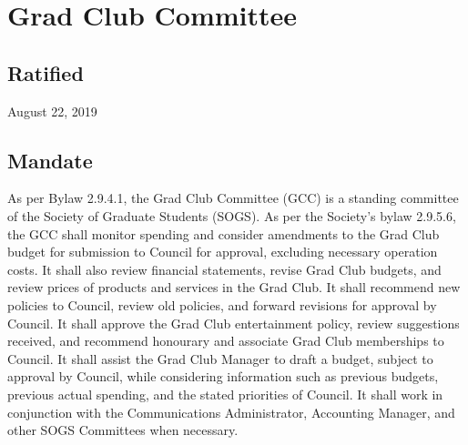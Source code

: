 \section{Grad Club Committee}

\subsection{Ratified}
August 22, 2019

\subsection{Mandate}
As per Bylaw 2.9.4.1, the Grad Club Committee (GCC) is a standing committee of the Society of Graduate Students (SOGS). As per the Society’s bylaw 2.9.5.6, the GCC shall monitor spending and consider amendments to the Grad Club budget for submission to Council for approval, excluding necessary operation costs. It shall also review financial statements, revise Grad Club budgets, and review prices of products and services in the Grad Club. It shall recommend new policies to Council, review old policies, and forward revisions for approval by Council. It shall approve the Grad Club entertainment policy, review suggestions received, and recommend honourary and associate Grad Club memberships to Council. It shall assist the Grad Club Manager to draft a budget, subject to approval by Council, while considering information such as previous budgets, previous actual spending, and the stated priorities of Council. It shall work in conjunction with the Communications Administrator, Accounting Manager, and other SOGS Committees when necessary.

